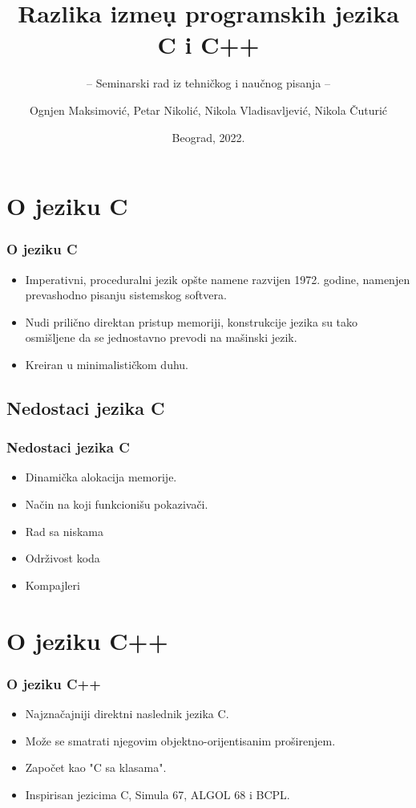 \documentclass{beamer}
\title{Razlika izme\d u programskih jezika C i C++}
\subtitle{-- Seminarski rad iz tehničkog i naučnog pisanja --}
\author{Ognjen Maksimović, Petar Nikolić, Nikola Vladisavljević, Nikola Čuturić}
\institute{Matematički fakultet\\Univerzitet u Beogradu}
\date{
	\footnotesize{Beograd, 2022.}	
}
\begin{document}
\begin{frame}
	\thispagestyle{empty}
	\titlepage
\end{frame}

\addtocounter{framenumber}{-1}

\section{O jeziku C}

\begin{frame}[fragile]\frametitle{O jeziku C}
	\begin{itemize}
		\item Imperativni, proceduralni jezik opšte namene razvijen 1972. godine, namenjen prevashodno pisanju sistemskog softvera.
            \item Nudi prilično direktan pristup memoriji, konstrukcije jezika su tako osmišljene da se jednostavno prevodi na mašinski jezik.
            \item Kreiran u minimalističkom duhu.
	\end{itemize}
\end{frame}

\subsection{Nedostaci jezika C}

\begin{frame}[fragile]\frametitle{Nedostaci jezika C}
	\begin{itemize}
	    \item Dinamička alokacija memorije.
		\item Način na koji funkcionišu pokazivači.
        \item Rad sa niskama
        \item Održivost koda
        \item Kompajleri
	\end{itemize}
\end{frame}

\section{O jeziku C++}

\begin{frame}[fragile]\frametitle{O jeziku C++}
	\begin{itemize}
		\item Najznačajniji direktni naslednik jezika C.
            \item Može se smatrati njegovim objektno-orijentisanim proširenjem.
            \item Započet kao "C sa klasama".
            \item Inspirisan jezicima C, Simula 67, ALGOL 68 i BCPL.
	\end{itemize}
\end{frame}
\end{document}
